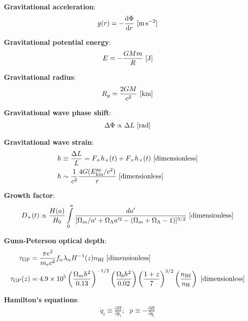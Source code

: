 \documentclass[a4paper,10pt]{article}
\begin{document}
{\noindent}\textbf{Gravitational acceleration}:
\begin{align*}
    g(r) = -\frac{{\rm d}\Phi}{{\rm d}r} ~ [{\rm m\,s^{-2}}]
\end{align*}

{\noindent}\textbf{Gravitational potential energy}:
\begin{align*}
    E = -\frac{GMm}{R} ~ [{\rm J}]
\end{align*}

{\noindent}\textbf{Gravitational radius}:
\begin{align*}
    R_g = \frac{2GM}{c^2} ~ [{\rm km}]
\end{align*}

{\noindent}\textbf{Gravitational wave phase shift}:
\begin{align*}
    \Delta\Phi \propto \Delta L ~ [{\rm rad}]
\end{align*}

{\noindent}\textbf{Gravitational wave strain}:
\begin{align*}
    h &\equiv \frac{\Delta L}{L} = F_+h_+(t) + F_\times h_\times(t) ~ [{\rm dimensionless}] \\
    h &\sim \frac{1}{c^2} \frac{4G(E_{\rm kin}^{\rm ns}/c^2)}{r}  ~ [{\rm dimensionless}]
\end{align*}

{\noindent}\textbf{Growth factor}:
\begin{align*}
    D_+(t) \propto \frac{H(a)}{H_0}\int\limits_0^a \frac{da'}{[\Omega_m/a'+\Omega_\Lambda a'^2-(\Omega_m+\Omega_\Lambda-1)]^{3/2}} ~ [{\rm dimensionless}]
\end{align*}

{\noindent}\textbf{Gunn-Peterson optical depth}:
\begin{align*}
    \tau_\mathrm{GP} &= \frac{\pi e^2}{m_ec^2}f_\alpha\lambda_\alpha H^{-1}(z)n_\mathrm{HI} ~ [{\rm dimensionless}] \\
    \tau_\mathrm{GP}(z) &= 4.9\times10^5 \left(\frac{\Omega_mh^2}{0.13}\right)^{-1/2} \left(\frac{\Omega_bh^2}{0.02}\right) \left(\frac{1+z}{7}\right)^{3/2} \left(\frac{n_\mathrm{HI}}{n_\mathrm{H}}\right) ~ [{\rm dimensionless}]
\end{align*}

{\noindent}\textbf{Hamilton's equations}:
\begin{align*}
    \dot{q}_i \equiv \frac{\partial H}{\partial p_i}; ~~~ \dot{p} \equiv -\frac{\partial H}{\partial q_i}
\end{align*}
\end{document}
